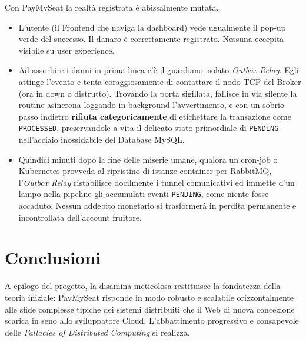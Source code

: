 \documentclass[11pt,a4paper]{report}
\begin{document}
Con PayMySeat la realt\`a registrata \`e abissalmente mutata.
\begin{itemize}
    \item L'utente (il Frontend che naviga la dashboard) vede ugualmente il pop-up verde del successo. Il danaro \`e correttamente registrato. Nessuna eccepita visibile su user experience.
    \item Ad assorbire i danni in prima linea c'\`e il guardiano isolato \textit{Outbox Relay}. Egli attinge l'evento e tenta coraggiosamente di contattare il nodo TCP del Broker (ora in down o distrutto). Trovando la porta sigillata, fallisce in via silente la routine asincrona loggando in background l'avvertimento, e con un sobrio passo indietro \textbf{rifiuta categoricamente} di etichettare la transazione come \texttt{PROCESSED}, preservandole a vita il delicato stato primordiale di \texttt{PENDING} nell'acciaio inossidabile del Database MySQL.
    \item Quindici minuti dopo la fine delle miserie umane, qualora un cron-job o Kubernetes provveda al ripristino di istanze container per RabbitMQ, l'\textit{Outbox Relay} ristabilisce docilmente i tunnel comunicativi ed immette d'un lampo nella pipeline gli accumulati eventi \texttt{PENDING}, come niente fosse accaduto. Nessun addebito monetario si trasformer\`a in perdita permanente e incontrollata dell'account fruitore.
\end{itemize}


\chapter{Conclusioni}

A epilogo del progetto, la disamina meticolosa restituisce la fondatezza della teoria iniziale: PayMySeat risponde in modo robusto e scalabile orizzontalmente alle sfide complesse tipiche dei sistemi distribuiti che il Web di nuova concezione scarica in seno allo sviluppatore Cloud. L'abbattimento progressivo e consapevole delle \textit{Fallacies of Distributed Computing} si realizza.
\end{document}
